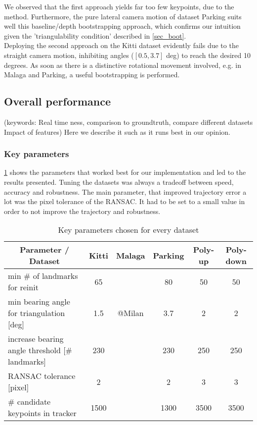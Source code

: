 We observed that the first approach yields far too few keypoints, due to the  method. Furthermore, the pure lateral camera motion of dataset Parking suits well this baseline/depth bootstrapping approach, which confirms our intuition given the 'triangulability condition' described in \cref{sec_boot}.\\

Deploying the second approach on the Kitti dataset evidently fails due to the straight camera motion, inhibiting angles ($[0.5, 3.7]$ deg) to reach the desired 10 degrees. As soon as there is a distinctive rotational movement involved, e.g. in Malaga and Parking, a useful bootstrapping is performed.


\subsection{Overall performance}
\textcolor[rgb]{1,0,0}{(keywords: Real time ness, comparison to groundtruth, compare different datasets
Impact of features) Here we describe it such as it runs best in our opinion.}

\subsubsection{Key parameters}
\cref{params_table} shows the parameters that worked best for our implementation and led to the results presented. Tuning the datasets was always a tradeoff between speed, accuracy and robustness. The main parameter, that improved trajectory error a lot was the pixel tolerance of the RANSAC. It had to be set to a small value in order to not improve the trajectory and robustness.
\begin{table}[!h]
	\centering
	\begin{tabular}{|l|c|c|c|c|c|}
	\hline
	\multicolumn{1}{|c|}{\textbf{Parameter / Dataset}} & \textbf{Kitti} & \textbf{Malaga} & \textbf{Parking} & \textbf{Poly-up} & \textbf{Poly-down} \\ \hline
	min \# of landmarks for reinit                     & 65             &                 & 80               & 50               & 50\\ \hline
	min bearing angle for triangulation {[}deg{]}      & 1.5            &  @Milan         & 3.7              & 2                & 2\\ \hline
	increase bearing angle threshold {[}\# landmarks{]}& 230            &                 & 230              & 250              & 250\\ \hline
	RANSAC tolerance {[}pixel{]}                       & 2              &                 & 2                & 3                & 3\\ \hline
	\# candidate keypoints in tracker                  & 1500           &                 & 1300             & 3500             & 3500\\ \hline
	\end{tabular}
	\caption{Key parameters chosen for every dataset}
	\label{params_table}
\end{table}
	
